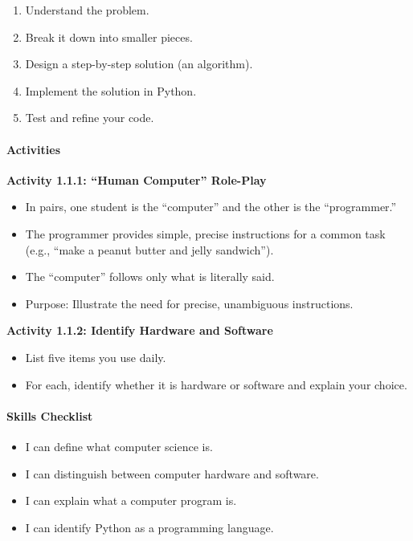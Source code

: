 \documentclass[
  justified,
  openright,
]{tufte-book}
\let\subsubsection\paragraph
\let\paragraph\paragraph
\let\subsubsection\paragraph
\let\paragraph\paragraph
\providecommand{\tightlist}{%
  \setlength{\itemsep}{0pt}\setlength{\parskip}{0pt}}
\begin{document}
\begin{enumerate}
\def\labelenumi{\arabic{enumi}.}
\tightlist
\item
  Understand the problem.
\item
  Break it down into smaller pieces.
\item
  Design a step-by-step solution (an algorithm).
\item
  Implement the solution in Python.
\item
  Test and refine your code.
\end{enumerate}

\subsubsection{Activities}\label{activities}

\textbf{Activity 1.1.1: ``Human Computer'' Role-Play}

\begin{itemize}
\tightlist
\item
  In pairs, one student is the ``computer'' and the other is the
  ``programmer.''
\item
  The programmer provides simple, precise instructions for a common task
  (e.g., ``make a peanut butter and jelly sandwich'').
\item
  The ``computer'' follows only what is literally said.
\item
  Purpose: Illustrate the need for precise, unambiguous instructions.
\end{itemize}

\textbf{Activity 1.1.2: Identify Hardware and Software}

\begin{itemize}
\tightlist
\item
  List five items you use daily.
\item
  For each, identify whether it is hardware or software and explain your
  choice.
\end{itemize}

\subsubsection{Skills Checklist}\label{skills-checklist-4}

\begin{itemize}
\tightlist
\item[$\square$]
  I can define what computer science is.
\item[$\square$]
  I can distinguish between computer hardware and software.
\item[$\square$]
  I can explain what a computer program is.
\item[$\square$]
  I can identify Python as a programming language.
\end{itemize}
\end{document}
